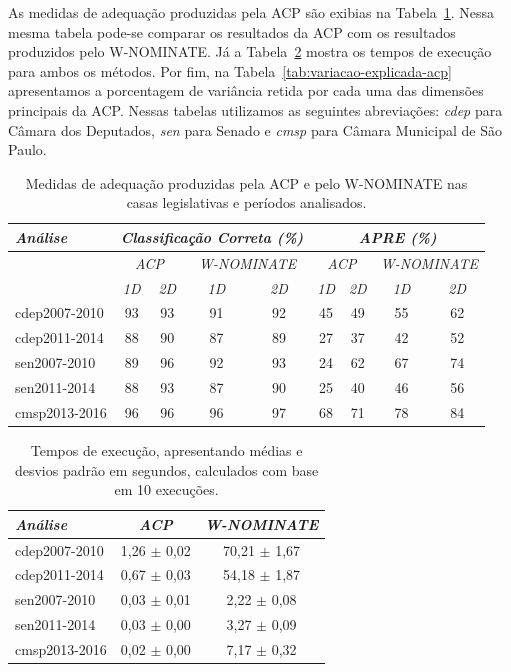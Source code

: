 \documentclass[a4paper, 12pt]{article}
\newcommand\wnominate{W-NOMINATE\xspace}
\begin{document}
As medidas de adequação produzidas pela ACP são exibias na Tabela~\ref{tab:fit}. Nessa mesma tabela pode-se comparar os resultados da ACP com os resultados produzidos pelo \wnominate. Já a Tabela~\ref{tab:tempos} mostra os tempos de execução para ambos os métodos. Por fim, na Tabela~\ref{tab:variacao-explicada-acp} apresentamos a porcentagem de variância retida por cada uma das dimensões principais da ACP. Nessas tabelas utilizamos as seguintes abreviações: \emph{cdep} para Câmara dos Deputados, \emph{sen} para Senado e \emph{cmsp} para Câmara Municipal de São Paulo.

\begin{table}
\centering
\begin{tabular}{l | c c | c c | c c | c c} 
\itshape Análise & \multicolumn{4}{c|}{\itshape Classificação Correta (\%)} & \multicolumn{4}{|c}{\itshape APRE (\%)} \\ 
\hline 
& \multicolumn{2}{c|}{\itshape ACP} & \multicolumn{2}{|c|}{\itshape \wnominate} & \multicolumn{2}{|c|}{\itshape ACP} & \multicolumn{2}{c}{\itshape \wnominate} \\ 
\hline 
& \itshape 1D & \itshape 2D & \itshape 1D & \itshape 2D & \itshape 1D & \itshape 2D & \itshape 1D & \itshape 2D \\ 
\hline 
cdep2007-2010 & 93 & 93 & 91 & 92 & 45 & 49 & 55 & 62 \\ 
cdep2011-2014 & 88 & 90 & 87 & 89 & 27 & 37 & 42 & 52 \\ 
sen2007-2010  & 89 & 96 & 92 & 93 & 24 & 62 & 67 & 74 \\ 
sen2011-2014  & 88 & 93 & 87 & 90 & 25 & 40 & 46 & 56 \\ 
cmsp2013-2016 & 96 & 96 & 96 & 97 & 68 & 71 & 78 & 84 \\ 
\end{tabular} 
\caption{Medidas de adequação produzidas pela ACP e pelo \wnominate nas casas legislativas e períodos analisados.}
\label{tab:fit}
\end{table}

\begin{table}
\centering
\begin{tabular}{l c c}
\itshape Análise & \itshape ACP & \itshape \wnominate \\
\hline
cdep2007-2010 & 1,26 $\pm$ 0,02 & 70,21 $\pm$ 1,67 \\ 
cdep2011-2014 & 0,67 $\pm$ 0,03 & 54,18 $\pm$ 1,87 \\ 
sen2007-2010  & 0,03 $\pm$ 0,01 & 2,22 $\pm$ 0,08  \\ 
sen2011-2014  & 0,03 $\pm$ 0,00 & 3,27 $\pm$ 0,09  \\ 
cmsp2013-2016 & 0,02 $\pm$ 0,00 & 7,17 $\pm$ 0,32  \\ 
\end{tabular} 
\caption{Tempos de execução, apresentando médias e desvios padrão em segundos, calculados com base em 10 execuções.}
\label{tab:tempos}
\end{table}
\end{document}
